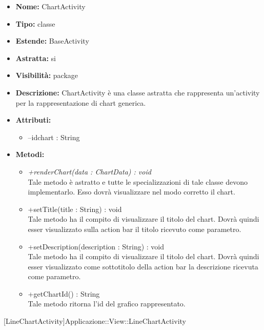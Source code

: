 			
			\begin{itemize}
			\item \textbf{Nome:} ChartActivity
			\item \textbf{Tipo:} classe
			
		\item \textbf{Estende:}
		BaseActivity
		\item \textbf{Astratta:}
		si
			\item \textbf{Visibilità:} package
			\item \textbf{Descrizione:} ChartActivity è una classe astratta che rappresenta un'activity per la rappresentazione di chart generica.
			\item \textbf{Attributi:}
				\begin{itemize}
				\setlength{\itemsep}{5pt}
				
					\item[\ding{111}] {--idchart : String}
				\end{itemize}
		
			\item \textbf{Metodi:}
				\begin{itemize}
				\setlength{\itemsep}{5pt}
				
					\item[\ding{111}] \textit{{+renderChart(data : ChartData) : void}} \\ [1mm] Tale metodo è astratto e tutte le specializzazioni di tale classe devono implementarlo. Esso dovrà visualizzare nel modo corretto il chart.
					\item[\ding{111}] {{+setTitle(title : String) : void}} \\ [1mm] Tale metodo ha il compito di visualizzare il titolo del chart. Dovrà quindi esser visualizzato sulla action bar il titolo ricevuto come parametro.
					\item[\ding{111}] {{+setDescription(description : String) : void}} \\ [1mm] Tale metodo ha il compito di visualizzare il titolo del chart. Dovrà quindi esser visualizzato come sottotitolo della action bar la descrizione ricevuta come parametro.
					\item[\ding{111}] {{+getChartId() : String}} \\ [1mm] Tale metodo ritorna l'id del grafico rappresentato.
				\end{itemize}
		
			\end{itemize}

			
			[LineChartActivity]{Applicazione::View::LineChartActivity}
			

